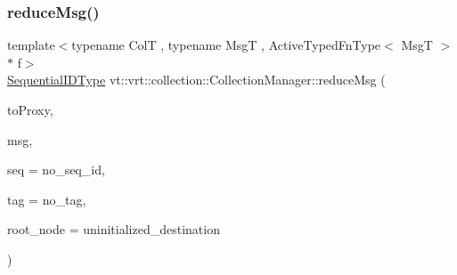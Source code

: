 \subsubsection{\texorpdfstring{reduce\+Msg()}{reduceMsg()}\hspace{0.1cm}{\footnotesize\ttfamily [1/2]}}
{\footnotesize\ttfamily template$<$typename ColT , typename MsgT , Active\+Typed\+Fn\+Type$<$ Msg\+T $>$ $\ast$ f$>$ \\
\hyperlink{namespacevt_a3063d4db3b879d6dd2c7b8d50995c7f6}{Sequential\+I\+D\+Type} vt\+::vrt\+::collection\+::\+Collection\+Manager\+::reduce\+Msg (\begin{DoxyParamCaption}\item[{\hyperlink{structvt_1_1vrt_1_1collection_1_1_collection_manager_a56458ed7f9bb22b631b9b3a745f42f94}{Collection\+Proxy\+Wrap\+Type}$<$ ColT, typename Col\+T\+::\+Index\+Type $>$ const \&}]{to\+Proxy,  }\item[{MsgT $\ast$const}]{msg,  }\item[{\hyperlink{namespacevt_a3063d4db3b879d6dd2c7b8d50995c7f6}{Sequential\+I\+D\+Type}}]{seq = {\ttfamily no\+\_\+seq\+\_\+id},  }\item[{\hyperlink{namespacevt_a84ab281dae04a52a4b243d6bf62d0e52}{Tag\+Type}}]{tag = {\ttfamily no\+\_\+tag},  }\item[{\hyperlink{namespacevt_a866da9d0efc19c0a1ce79e9e492f47e2}{Node\+Type}}]{root\+\_\+node = {\ttfamily uninitialized\+\_\+destination} }\end{DoxyParamCaption})}

\mbox{\label{structvt_1_1vrt_1_1collection_1_1_collection_manager_aa24e7490a90e19962634be37e7d8fe95}} 

